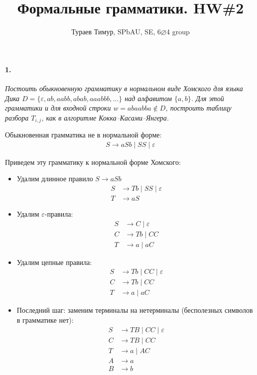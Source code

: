 \documentclass[russian]{article}
\begin{document}
\title{Формальные грамматики. HW\#2}
\author{Тураев Тимур, SPbAU, SE, 6$\varnothing$4 group}
\maketitle

\paragraph*{1.}

\textit{Постоить обыкновенную грамматику в нормальном виде Хомского для языка Дика $D=\{\varepsilon, ab, aabb, abab, aaabbb, \ldots\}$ над алфавитом $\{a,b\}$. Для этой грамматики и для входной строки $w=abaabba \notin D$, построить таблицу разбора $T_{i,j}$, как в алгоритме Кокка–Касами–Янгера.}

Обыкновенная грамматика не в нормальной форме:
\begin{align*}
S \to aSb \mid SS \mid \varepsilon
\end{align*}

Приведем эту грамматику к нормальной форме Хомского:

\begin{itemize}
\item Удалим длинное правило $S \to aSb$
\begin{align*}
S & \to Tb \mid SS \mid \varepsilon \\
T & \to aS
\end{align*}

\item Удалим $\varepsilon$-правила:
\begin{align*}
S & \to C \mid \varepsilon \\
C & \to Tb \mid CC \\
T & \to a \mid aC
\end{align*}

\item Удалим цепные правила:
\begin{align*}
S & \to Tb \mid CC \mid \varepsilon \\
C & \to Tb \mid CC \\
T & \to a \mid aC
\end{align*}

\item Последний шаг: заменим терминалы на нетерминалы (бесполезных символов в грамматике нет):
\begin{align*}
S & \to TB \mid CC \mid \varepsilon \\
C & \to TB \mid CC \\
T & \to a \mid AC \\
A & \to a \\
B & \to b
\end{align*}
\end{itemize}
\end{document}
